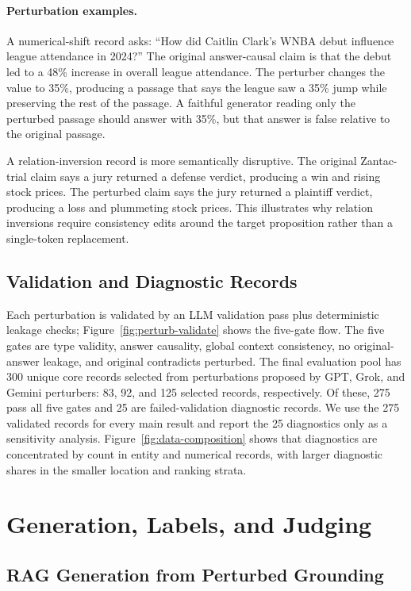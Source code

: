 \paragraph{Perturbation examples.}
A numerical-shift record asks: ``How did Caitlin Clark's WNBA debut influence league attendance in 2024?'' The original answer-causal claim is that the debut led to a 48\% increase in overall league attendance. The perturber changes the value to 35\%, producing a passage that says the league saw a 35\% jump while preserving the rest of the passage. A faithful generator reading only the perturbed passage should answer with 35\%, but that answer is false relative to the original passage.

A relation-inversion record is more semantically disruptive. The original Zantac-trial claim says a jury returned a defense verdict, producing a win and rising stock prices. The perturbed claim says the jury returned a plaintiff verdict, producing a loss and plummeting stock prices. This illustrates why relation inversions require consistency edits around the target proposition rather than a single-token replacement.

\subsection{Validation and Diagnostic Records}

Each perturbation is validated by an LLM validation pass plus deterministic leakage checks; Figure~\ref{fig:perturb-validate} shows the five-gate flow. The five gates are type validity, answer causality, global context consistency, no original-answer leakage, and original contradicts perturbed. The final evaluation pool has 300 unique core records selected from perturbations proposed by GPT, Grok, and Gemini perturbers: 83, 92, and 125 selected records, respectively. Of these, 275 pass all five gates and 25 are failed-validation diagnostic records. We use the 275 validated records for every main result and report the 25 diagnostics only as a sensitivity analysis. Figure~\ref{fig:data-composition} shows that diagnostics are concentrated by count in entity and numerical records, with larger diagnostic shares in the smaller location and ranking strata.

\section{Generation, Labels, and Judging}

\subsection{RAG Generation from Perturbed Grounding}

